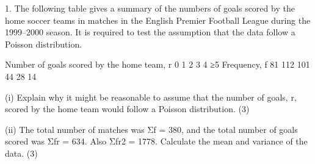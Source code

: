 \documentclass[a4paper,12pt]{article}
\begin{document}
\begin{framed}
1. The following table gives a summary of the numbers of goals scored by the home soccer teams in matches in the English Premier Football League during the 1999–2000 season.  It is required to test the assumption that the data follow a Poisson distribution. 
 
Number of goals scored by the home team, r 0 1 2 3 4 ≥5 Frequency, f 81 112 101 44 28 14 
 
 
(i) Explain why it might be reasonable to assume that the number of goals, r, scored by the home team would follow a Poisson distribution. (3) 
 
(ii) The total number of matches was Σf = 380, and the total number of goals scored was Σfr = 634.  Also Σfr2 = 1778.  Calculate the mean and variance of the data. (3) 
\end{framed}
\end{document}
